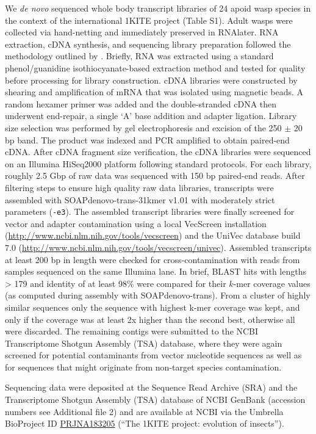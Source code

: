 We \emph{de novo} sequenced whole body transcript libraries of 24 apoid
wasp species in the context of the international 1KITE project (Table
S1). Adult wasps were collected via hand-netting and immediately
preserved in RNAlater. RNA extraction, cDNA synthesis, and sequencing
library preparation followed the methodology outlined by
\citep{Misof2014}. Briefly, RNA was extracted using a standard
phenol/guanidine isothiocyanate-based extraction method and tested for
quality before processing for library construction. cDNA libraries were
constructed by shearing and amplification of mRNA that was isolated
using magnetic beads. A random hexamer primer was added and the
double-stranded cDNA then underwent end-repair, a single `A' base
addition and adapter ligation. Library size selection was performed by
gel electrophoresis and excision of the 250 $\pm$ 20 bp band. The
product was indexed and PCR amplified to obtain paired-end cDNA. After
cDNA fragment size verification, the cDNA libraries were sequenced on an
Illumina HiSeq2000 platform following standard protocols. For each
library, roughly 2.5 Gbp of raw data was sequenced with 150 bp
paired-end reads. After filtering steps to ensure high quality raw data
libraries, transcripts were assembled with SOAPdenovo-trans-31kmer v1.01
\citep{Xie2014} with moderately strict parameters (\texttt{-e3}). The
assembled transcript libraries were finally screened for vector and
adapter contamination using a local VecScreen installation
(\url{http://www.ncbi.nlm.nih.gov/tools/vecscreen}) and the UniVec
database build 7.0
(\url{http://www.ncbi.nlm.nih.gov/tools/vecscreen/univec}). Assembled
transcripts at least 200 bp in length were checked for
cross-contamination with reads from samples sequenced on the same
Illumina lane. In brief, BLAST hits with lengths \textgreater{} 179 and
identity of at least 98\% were compared for their $k$-mer coverage
values (as computed during assembly with SOAPdenovo-trans). From a
cluster of highly similar sequences only the sequence with highest k-mer
coverage was kept, and only if the coverage was at least 2x higher than
the second best, otherwise all were discarded. The remaining contigs
were submitted to the NCBI Transcriptome Shotgun Assembly (TSA)
database, where they were again screened for potential contaminants from
vector nucleotide sequences as well as for sequences that might
originate from non-target species contamination.

Sequencing data were deposited at the Sequence Read Archive (SRA) and
the Transcriptome Shotgun Assembly (TSA) database of NCBI GenBank
(accession numbers see Additional file 2) and are available at NCBI via
the Umbrella BioProject ID
\href{http://www.ncbi.nlm.nih.gov/bioproject/?term=PRJNA183205}{PRJNA183205}
(``The 1KITE project: evolution of insects'').

